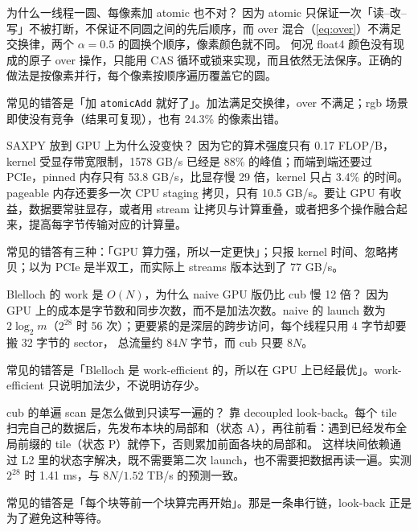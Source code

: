 \documentclass[11pt,a4paper]{ctexart}
\begin{document}
\begin{iqbox}{为什么一线程一圆、每像素加 atomic 也不对？}
因为 atomic 只保证一次「读--改--写」不被打断，不保证不同圆之间的先后顺序，而 over 混合（\cref{eq:over}）不满足交换律，两个 $\alpha=0.5$ 的圆换个顺序，像素颜色就不同。
何况 float4 颜色没有现成的原子 over 操作，只能用 CAS 循环或锁来实现，而且依然无法保序。正确的做法是按像素并行，每个像素按顺序遍历覆盖它的圆。
\par 常见的错答是「加 \texttt{atomicAdd} 就好了」。加法满足交换律，over 不满足；rgb 场景即使没有竞争（结果可复现），也有 24.3\% 的像素出错。
\end{iqbox}

\begin{iqbox}{SAXPY 放到 GPU 上为什么没变快？}
因为它的算术强度只有 0.17 FLOP/B，kernel 受显存带宽限制，1578 GB/s 已经是 88\% 的峰值；而端到端还要过 PCIe，pinned 内存只有 53.8 GB/s，比显存慢 29 倍，kernel 只占 3.4\% 的时间。
pageable 内存还要多一次 CPU staging 拷贝，只有 10.5 GB/s。要让 GPU 有收益，数据要常驻显存，或者用 stream 让拷贝与计算重叠，或者把多个操作融合起来，提高每字节传输对应的计算量。
\par 常见的错答有三种：「GPU 算力强，所以一定更快」；只报 kernel 时间、忽略拷贝；以为 PCIe 是半双工，而实际上 streams 版本达到了 77 GB/s。
\end{iqbox}

\begin{iqbox}{Blelloch 的 work 是 $O(N)$，为什么 naive GPU 版仍比 cub 慢 12 倍？}
因为 GPU 上的成本是字节数和同步次数，而不是加法次数。naive 的 launch 数为 $2\log_2 m$（$2^{28}$ 时 56 次）；更要紧的是深层的跨步访问，每个线程只用 4 字节却要搬 32 字节的 sector，
总流量约 $84N$ 字节，而 cub 只要 $8N$。
\par 常见的错答是「Blelloch 是 work-efficient 的，所以在 GPU 上已经最优」。work-efficient 只说明加法少，不说明访存少。
\end{iqbox}

\begin{iqbox}{cub 的单遍 scan 是怎么做到只读写一遍的？}
靠 decoupled look-back\cite{merrill2016}。每个 tile 扫完自己的数据后，先发布本块的局部和（状态 A），再往前看：遇到已经发布全局前缀的 tile（状态 P）就停下，否则累加前面各块的局部和。
这样块间依赖通过 L2 里的状态字解决，既不需要第二次 launch，也不需要把数据再读一遍。实测 $2^{28}$ 时 1.41 ms，与 $8N/1.52$ TB/s 的预测一致。
\par 常见的错答是「每个块等前一个块算完再开始」。那是一条串行链，look-back 正是为了避免这种等待。
\end{iqbox}
\end{document}
